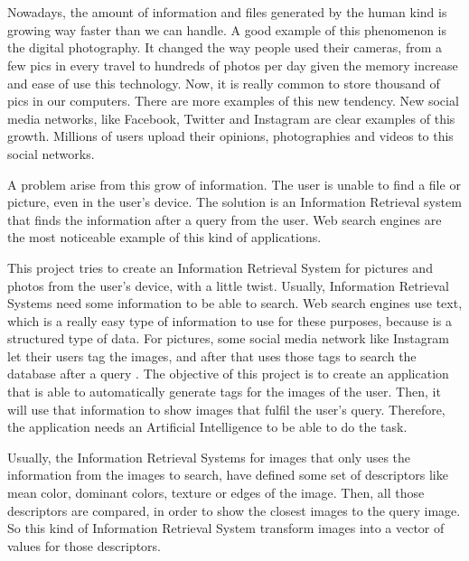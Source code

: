 \\

\vspace{0.7cm}
\\

Nowadays, the amount of information and files generated by the human kind is growing way faster than we can handle. A good example of this phenomenon is the digital photography. It changed the way people used their cameras, from a few pics in every travel to hundreds of photos per day given the memory increase and ease of use this technology. Now, it is really common to store thousand of pics in our computers.  There are more examples of this new tendency.  New social media networks, like Facebook, Twitter and Instagram are clear examples of this growth. Millions of users upload their opinions, photographies and videos to this social networks. 

A problem arise from this grow of information. The user is unable to find a file or picture, even in the user’s device. The solution is an Information Retrieval system  that finds the information after a query from the user. Web search engines are the most noticeable example of this kind of applications.

This project tries to create an Information Retrieval System for pictures and photos from the user’s device, with a little twist. Usually, Information Retrieval Systems need some information to be able to search. Web search engines use text, which is a really easy type of information to use for these purposes, because is a structured type of data. For pictures, some social media network like Instagram let their users tag the images, and after that uses those tags to search the database after a query . The objective of this project is to create an application that is able to automatically generate tags for the images of the user. Then, it will use that information to show images that fulfil the user’s query. Therefore, the application needs an Artificial Intelligence to be able to do the task. 

Usually, the Information Retrieval Systems for images that only uses the information from the images to search, have defined some set of descriptors like mean color, dominant colors, texture or edges of the image. Then, all those descriptors are compared, in order to show the closest images to the query image. So this kind of Information Retrieval System transform images into a vector of values for those descriptors.

